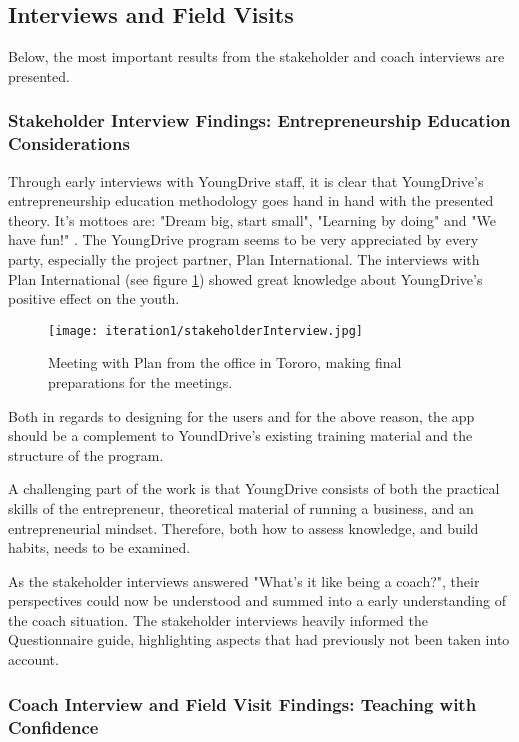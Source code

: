 \subsection{Interviews and Field Visits}

Below, the most important results from the stakeholder and coach interviews are presented.

\subsubsection{Stakeholder Interview Findings: Entrepreneurship Education Considerations}
Through early interviews with YoungDrive staff, it is clear that YoungDrive's entrepreneurship education methodology goes hand in hand with the presented theory. It's mottoes are: "Dream big, start small", "Learning by doing" and "We have fun!" \citep{youngdrive-manual}. The YoungDrive program seems to be very appreciated by every party, especially the project partner, Plan International. The interviews with Plan International (see figure \ref{fig:stakeholderInterview}) showed great knowledge about YoungDrive's positive effect on the youth.

\begin{figure}[h]
  \centering
  \texttt{[image: iteration1/stakeholderInterview.jpg]}
  \caption{Meeting with Plan from the office in Tororo, making final preparations for the meetings.}
  \label{fig:stakeholderInterview}
\end{figure}

Both in regards to designing for the users and for the above reason, the app should be a complement to YoundDrive's existing training material and the structure of the program.

A challenging part of the work is that YoungDrive consists of both the practical skills of the entrepreneur, theoretical material of running a business, and an entrepreneurial mindset. Therefore, both how to assess knowledge, and build habits, needs to be examined.

As the stakeholder interviews answered "What's it like being a coach?", their perspectives could now be understood and summed into a early understanding of the coach situation. The stakeholder interviews heavily informed the Questionnaire guide, highlighting aspects that had previously not been taken into account.

\subsubsection{Coach Interview and Field Visit Findings: Teaching with Confidence}

